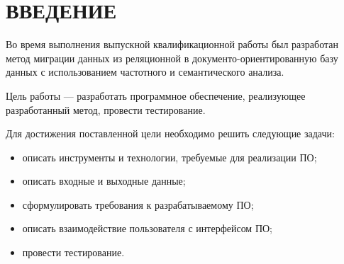 \chapter*{ВВЕДЕНИЕ}

Во время выполнения выпускной квалификационной работы был разработан
метод миграции данных из реляционной в документо-ориентированную базу данных
с использованием частотного и семантического анализа.

Цель работы --- разработать программное обеспечение, реализующее разработанный метод,
провести тестирование.

Для достижения поставленной цели необходимо решить следующие задачи:
\begin{itemize}[label=---]
  \item описать инструменты и технологии, требуемые для реализации ПО;
  \item описать входные и выходные данные;
  \item сформулировать требования к разрабатываемому ПО;
  \item описать взаимодействие пользователя с интерфейсом ПО;
  \item провести тестирование.
\end{itemize}

  
